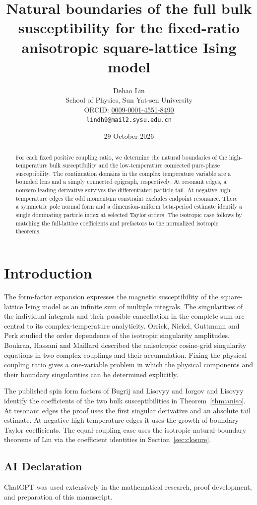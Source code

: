 \documentclass[11pt]{article}
\title{Natural boundaries of the full bulk susceptibility\newline
for the fixed-ratio anisotropic square-lattice Ising model}
\author{Dehao Lin\\{\small School of Physics, Sun Yat-sen University}\\{\small ORCID: \href{https://orcid.org/0009-0001-4551-8490}{0009-0001-4551-8490}}\\{\small\texttt{lindh9@mail2.sysu.edu.cn}}}
\date{29 October 2026}
\numberwithin{equation}{section}
\theoremstyle{definition}
\begin{document}
\maketitle
\begin{abstract}
For each fixed positive coupling ratio, we determine the natural
boundaries of the high-temperature bulk susceptibility and the
low-temperature connected pure-phase susceptibility. The continuation
domains in the complex temperature variable are a bounded lens and a
simply connected epigraph, respectively. At resonant edges, a nonzero
leading derivative survives the differentiated particle tail.
At negative high-temperature edges the odd momentum constraint
excludes endpoint resonance. There a symmetric pole normal form and a
dimension-uniform beta-period estimate identify a single dominating
particle index at selected Taylor orders. The isotropic case follows
by matching the full-lattice coefficients and prefactors to the
normalized isotropic theorems.
\end{abstract}
\section*{Introduction}
The form-factor expansion expresses the magnetic susceptibility of the
square-lattice Ising model as an infinite sum of multiple integrals.
The singularities of the individual integrals and their possible
cancellation in the complete sum are central to its complex-temperature
analyticity. Orrick, Nickel, Guttmann and Perk \cite[Section 3.2]{ONGP}
studied the order dependence of the isotropic singularity amplitudes.
Boukraa, Hassani and Maillard \cite[Section 6.2]{BHM} described the
anisotropic cosine-grid singularity equations in two complex couplings
and their accumulation. Fixing the physical coupling ratio gives a
one-variable problem in which the physical components and their
boundary singularities can be determined explicitly.

The published spin form factors of Bugrij and Lisovyy \cite{BL} and
Iorgov and Lisovyy \cite{IL} identify the coefficients of the two bulk
susceptibilities in Theorem~\ref{thm:aniso}. At resonant edges the proof
uses the first singular derivative and an absolute tail estimate.
At negative high-temperature edges it uses the growth of boundary
Taylor coefficients. The equal-coupling case uses the isotropic
natural-boundary theorems of Lin \cite{LTsource,HTsource} via the
coefficient identities in Section~\ref{sec:closure}.

\subsection*{AI Declaration}
ChatGPT was used extensively in the mathematical research, proof development,
and preparation of this manuscript.
\end{document}
